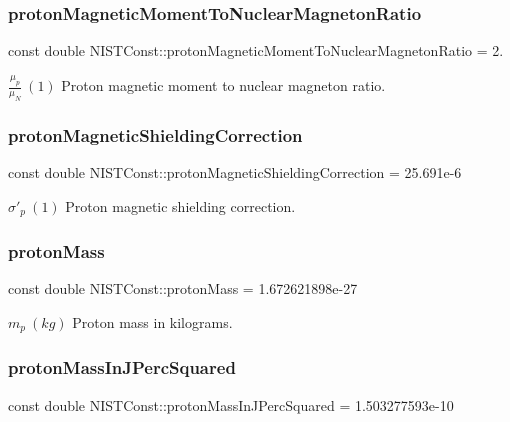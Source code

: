 \subsubsection{\texorpdfstring{proton\+Magnetic\+Moment\+To\+Nuclear\+Magneton\+Ratio}{protonMagneticMomentToNuclearMagnetonRatio}}
{\footnotesize\ttfamily const double N\+I\+S\+T\+Const\+::proton\+Magnetic\+Moment\+To\+Nuclear\+Magneton\+Ratio = 2.}

$\frac{\mu_p}{\mu_N} \ (1)$ Proton magnetic moment to nuclear magneton ratio. \mbox{\label{group___proton_ga401cef12f93ba64cca44703bbdb516e7}} 
\subsubsection{\texorpdfstring{proton\+Magnetic\+Shielding\+Correction}{protonMagneticShieldingCorrection}}
{\footnotesize\ttfamily const double N\+I\+S\+T\+Const\+::proton\+Magnetic\+Shielding\+Correction = 25.\+691e-\/6}

$\sigma'_p \ (1)$ Proton magnetic shielding correction. \mbox{\label{group___proton_gaa6738785a6bf04323231318dd6b2ed90}} 
\subsubsection{\texorpdfstring{proton\+Mass}{protonMass}}
{\footnotesize\ttfamily const double N\+I\+S\+T\+Const\+::proton\+Mass = 1.\+672621898e-\/27}

$m_p \ (kg)$ Proton mass in kilograms. \mbox{\label{group___proton_gae46a62aa4ccd40b74db6a45a3933cf0f}} 
\subsubsection{\texorpdfstring{proton\+Mass\+In\+J\+Perc\+Squared}{protonMassInJPercSquared}}
{\footnotesize\ttfamily const double N\+I\+S\+T\+Const\+::proton\+Mass\+In\+J\+Perc\+Squared = 1.\+503277593e-\/10}

